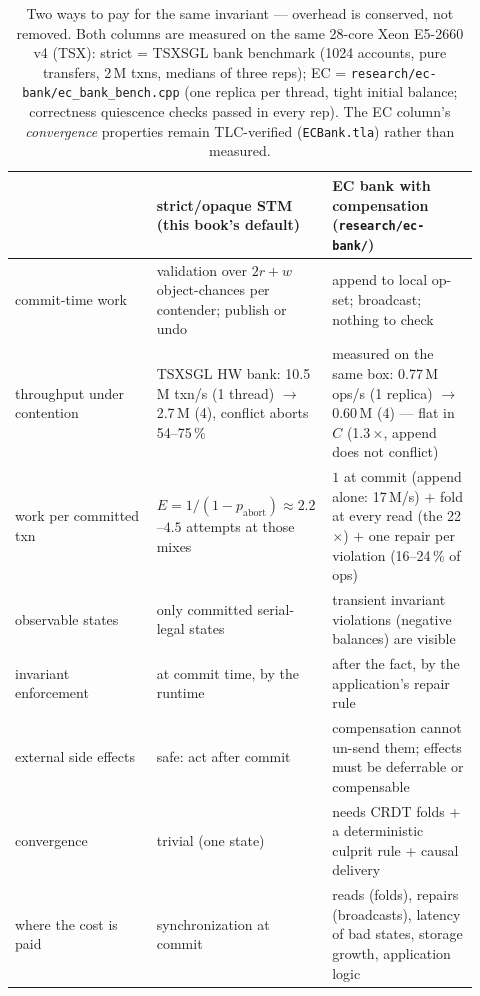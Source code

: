 \begin{table}[htbp]
\centering
\small
\begin{tabular}{M{0.30\linewidth}M{0.31\linewidth}M{0.31\linewidth}}
\hline
 & \textbf{strict/opaque STM} (this book's default) & \textbf{EC bank with compensation} (\texttt{research/ec-bank/}) \\
\hline
commit-time work & validation over $2r{+}w$ object-chances per contender; publish or undo & append to local op-set; broadcast; nothing to check \\
throughput under contention & TSXSGL HW bank: 10.5\,M txn/s (1 thread) $\to$ 2.7\,M (4), conflict aborts 54--75\,$\%$ & measured on the same box: 0.77\,M ops/s (1 replica) $\to$ 0.60\,M (4) --- flat in $C$ (1.3\,$\times$, append does not conflict) \\
work per committed txn & $E = 1/(1-p_{\mathrm{abort}}) \approx 2.2$--$4.5$ attempts at those mixes & $1$ at commit (append alone: 17\,M/s) $+$ fold at every read (the 22\,$\times$) $+$ one repair per violation (16--24\,$\%$ of ops) \\
observable states & only committed serial-legal states & transient invariant violations (negative balances) are visible \\
invariant enforcement & at commit time, by the runtime & after the fact, by the application's repair rule \\
external side effects & safe: act after commit & compensation cannot un-send them; effects must be deferrable or compensable \\
convergence & trivial (one state) & needs CRDT folds + a deterministic culprit rule + causal delivery \\
where the cost is paid & synchronization at commit & reads (folds), repairs (broadcasts), latency of bad states, storage growth, application logic \\
\hline
\end{tabular}
\caption{Two ways to pay for the same invariant --- overhead is conserved,
not removed. Both columns are measured on the same 28-core Xeon E5-2660
v4 (TSX): strict = TSXSGL bank benchmark (1024 accounts, pure transfers,
2\,M txns, medians of three reps); EC =
\texttt{research/ec-bank/ec\_bank\_bench.cpp} (one replica per thread,
tight initial balance; correctness quiescence checks passed in every
rep). The EC column's \emph{convergence} properties remain TLC-verified
(\texttt{ECBank.tla}) rather than measured.}
\label{tab:ec-vs-stm}
\end{table}

